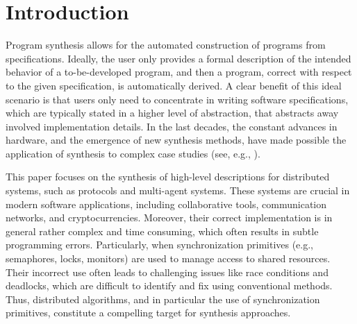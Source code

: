 \section{Introduction} \label{sec:Intro}

Program synthesis \cite{MannaWolper84,PnueliRosner89,EmersonClarke82} allows for the automated construction of programs from specifications. Ideally, the user only provides a formal description of the intended behavior of a to-be-developed program, and then a program, correct with respect to the given specification, is automatically derived. A clear benefit of this ideal scenario  is that users only need to concentrate in writing software specifications, which are typically stated in a higher level of abstraction, that abstracts away involved implementation details. In the last decades, the constant advances in hardware, and the emergence of new synthesis methods, have made possible the application of synthesis to complex case studies (see, e.g.,  \cite{BGJPPW07a}). 

This paper focuses on the synthesis of high-level descriptions for distributed systems, such as protocols and multi-agent systems. These systems are crucial in modern software applications, including collaborative tools, communication networks, and cryptocurrencies. Moreover, their correct implementation is in general rather complex and time consuming,  which often results in subtle programming errors.
Particularly, when synchronization primitives (e.g., semaphores, locks, monitors) are used to manage access to shared resources.  Their incorrect use often leads to challenging issues like race conditions and deadlocks,  which are difficult to identify and fix using conventional methods. Thus, distributed algorithms, and in particular the use of synchronization primitives, constitute a compelling target for synthesis approaches. 


